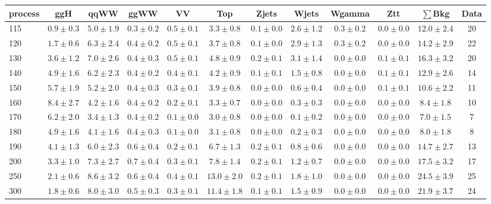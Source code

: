 \begin{table}[!hb]
{\footnotesize
 \begin{center}
 \begin{tabular}{l c c c c c c c c c c c }
 \hline
 process & ggH & qqWW & ggWW & VV & Top & Zjets & Wjets & Wgamma & Ztt & $\sum$Bkg & Data \\
 \hline
115 & $0.9\pm0.3$ & $5.0\pm1.9$ & $0.3\pm0.2$ & $0.5\pm0.1$ & $3.3\pm0.8$ & $0.1\pm0.0$ & $2.6\pm1.2$ & $0.3\pm0.2$ & $0.0\pm0.0$ & $12.0\pm2.4$ & 20 \\
120 & $1.7\pm0.6$ & $6.3\pm2.4$ & $0.4\pm0.2$ & $0.5\pm0.1$ & $3.7\pm0.8$ & $0.1\pm0.0$ & $2.9\pm1.3$ & $0.3\pm0.2$ & $0.0\pm0.0$ & $14.2\pm2.9$ & 22 \\
130 & $3.6\pm1.2$ & $7.0\pm2.6$ & $0.4\pm0.3$ & $0.5\pm0.1$ & $4.8\pm0.9$ & $0.2\pm0.1$ & $3.1\pm1.4$ & $0.0\pm0.0$ & $0.1\pm0.1$ & $16.3\pm3.2$ & 20 \\
140 & $4.9\pm1.6$ & $6.2\pm2.3$ & $0.4\pm0.2$ & $0.4\pm0.1$ & $4.2\pm0.9$ & $0.1\pm0.1$ & $1.5\pm0.8$ & $0.0\pm0.0$ & $0.1\pm0.1$ & $12.9\pm2.6$ & 14 \\
150 & $5.7\pm1.9$ & $5.2\pm2.0$ & $0.4\pm0.3$ & $0.3\pm0.1$ & $3.9\pm0.8$ & $0.0\pm0.0$ & $0.6\pm0.4$ & $0.0\pm0.0$ & $0.1\pm0.1$ & $10.6\pm2.2$ & 11 \\
160 & $8.4\pm2.7$ & $4.2\pm1.6$ & $0.4\pm0.2$ & $0.2\pm0.1$ & $3.3\pm0.7$ & $0.0\pm0.0$ & $0.3\pm0.3$ & $0.0\pm0.0$ & $0.0\pm0.0$ & $8.4\pm1.8$ & 10 \\
170 & $6.2\pm2.0$ & $3.4\pm1.3$ & $0.4\pm0.2$ & $0.1\pm0.0$ & $3.0\pm0.8$ & $0.0\pm0.0$ & $0.1\pm0.2$ & $0.0\pm0.0$ & $0.0\pm0.0$ & $7.0\pm1.5$ & 7 \\
180 & $4.9\pm1.6$ & $4.1\pm1.6$ & $0.4\pm0.3$ & $0.1\pm0.0$ & $3.1\pm0.8$ & $0.0\pm0.0$ & $0.2\pm0.3$ & $0.0\pm0.0$ & $0.0\pm0.0$ & $8.0\pm1.8$ & 8 \\
190 & $4.1\pm1.3$ & $6.0\pm2.3$ & $0.6\pm0.4$ & $0.2\pm0.1$ & $6.7\pm1.3$ & $0.2\pm0.1$ & $0.8\pm0.6$ & $0.0\pm0.0$ & $0.0\pm0.0$ & $14.7\pm2.7$ & 13 \\
200 & $3.3\pm1.0$ & $7.3\pm2.7$ & $0.7\pm0.4$ & $0.3\pm0.1$ & $7.8\pm1.4$ & $0.2\pm0.1$ & $1.2\pm0.7$ & $0.0\pm0.0$ & $0.0\pm0.0$ & $17.5\pm3.2$ & 17 \\
250 & $2.1\pm0.6$ & $8.6\pm3.2$ & $0.6\pm0.4$ & $0.4\pm0.1$ & $13.0\pm2.0$ & $0.2\pm0.1$ & $1.8\pm1.0$ & $0.0\pm0.0$ & $0.0\pm0.0$ & $24.5\pm3.9$ & 25 \\
300 & $1.8\pm0.6$ & $8.0\pm3.0$ & $0.5\pm0.3$ & $0.3\pm0.1$ & $11.4\pm1.8$ & $0.1\pm0.1$ & $1.5\pm0.9$ & $0.0\pm0.0$ & $0.0\pm0.0$ & $21.9\pm3.7$ & 24 \\

\end{tabular}
\end{center}}
\end{table}
